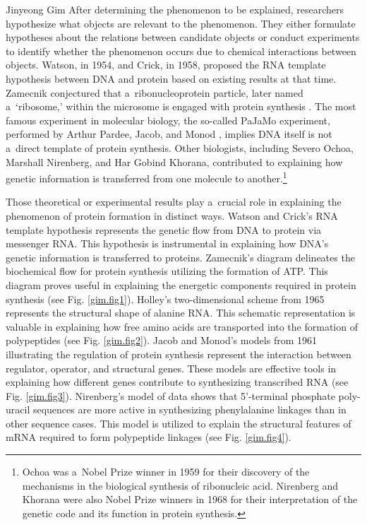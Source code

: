 \begin{artengenv}{Jinyeong Gim}
After determining the phenomenon to be explained, researchers hypothesize what objects are relevant to the phenomenon. They either formulate hypotheses about the relations between candidate objects or conduct experiments to identify whether the phenomenon occurs due to chemical interactions between objects. Watson, in 1954, and Crick, in 1958, proposed the RNA template hypothesis between DNA and protein based on existing results at that time. Zamecnik conjectured that a~ribonucleoprotein particle, later named a~‘ribosome,' within the microsome is engaged with protein synthesis
\parencite[][]{hoagland_soluble_1958}. %
 The most famous experiment in molecular biology, the so-called PaJaMo experiment, performed by Arthur Pardee, Jacob, and Monod 
\parencite*[][]{pardee_genetic_1959}, %
 implies DNA itself is not a~direct template of protein synthesis. Other biologists, including Severo Ochoa, Marshall Nirenberg, and Har Gobind Khorana, contributed to explaining how genetic information is transferred from one molecule to another.\footnote{Ochoa was a~Nobel Prize winner in 1959 for their discovery of the mechanisms in the biological synthesis of ribonucleic acid. Nirenberg and Khorana were also Nobel Prize winners in 1968 for their interpretation of the genetic code and its function in protein synthesis.}

Those theoretical or experimental results play a~crucial role in explaining the phenomenon of protein formation in distinct ways. Watson and Crick's RNA template hypothesis represents the genetic flow from DNA to protein via messenger RNA. This hypothesis is instrumental in explaining how DNA's genetic information is transferred to proteins. Zamecnik's diagram delineates the biochemical flow for protein synthesis utilizing the formation of ATP. This diagram proves useful in explaining the energetic components required in protein synthesis (see Fig. \ref{gim.fig1}). Holley's two-dimensional scheme from 1965 represents the structural shape of alanine RNA. This schematic representation is valuable in explaining how free amino acids are transported into the formation of polypeptides (see Fig. \ref{gim.fig2}). Jacob and Monod's models from 1961 illustrating the regulation of protein synthesis represent the interaction between regulator, operator, and structural genes. These models are effective tools in explaining how different genes contribute to synthesizing transcribed RNA (see Fig. \ref{gim.fig3}). Nirenberg's model of data shows that 5'-terminal phosphate poly-uracil sequences are more active in synthesizing phenylalanine linkages than in other sequence cases. This model is utilized to explain the structural features of mRNA required to form polypeptide linkages (see Fig. \ref{gim.fig4}).


\end{artengenv}
